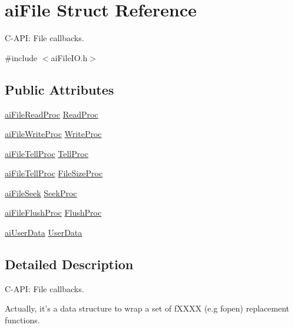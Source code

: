 \hypertarget{structai_file}{\section{ai\-File Struct Reference}
\label{structai_file}
}


C-\/\-A\-P\-I\-: File callbacks.  




{\ttfamily \#include $<$ai\-File\-I\-O.\-h$>$}

\subsection*{Public Attributes}
\begin{DoxyCompactItemize}
\item 
\hyperlink{ai_file_i_o_8h_ac75a77859a761dafe8c0a149316c9025}{ai\-File\-Read\-Proc} \hyperlink{structai_file_a52287e81ca67b9d43cc1ce6142f781fa}{Read\-Proc}
\item 
\hyperlink{ai_file_i_o_8h_ab25827ce1f6f1fcb37232f1e945947da}{ai\-File\-Write\-Proc} \hyperlink{structai_file_ab9fca3a62e34a33592c13a6f31db7d1d}{Write\-Proc}
\item 
\hyperlink{ai_file_i_o_8h_a91bcb34135f0fc52b84d0a71b1ac9416}{ai\-File\-Tell\-Proc} \hyperlink{structai_file_aaf2d88a3b2fcbdacf51119658283d27e}{Tell\-Proc}
\item 
\hyperlink{ai_file_i_o_8h_a91bcb34135f0fc52b84d0a71b1ac9416}{ai\-File\-Tell\-Proc} \hyperlink{structai_file_aff2fff8c0458e7ec71f7de217c3a3033}{File\-Size\-Proc}
\item 
\hyperlink{ai_file_i_o_8h_a21b9c66913c05cd79fad0eece086efb3}{ai\-File\-Seek} \hyperlink{structai_file_a7a07b499be4ad433669246479a4d4ad2}{Seek\-Proc}
\item 
\hyperlink{ai_file_i_o_8h_ab7018edd452f13ade57309865cb3bcdb}{ai\-File\-Flush\-Proc} \hyperlink{structai_file_a1102d28d1c0be68ffed20476669bdb0d}{Flush\-Proc}
\item 
\hyperlink{ai_file_i_o_8h_a176132d0cd51c96302089ff3f8a8ee1c}{ai\-User\-Data} \hyperlink{structai_file_aec528fa18f4755fe4f28d604fde28aad}{User\-Data}
\end{DoxyCompactItemize}


\subsection{Detailed Description}
C-\/\-A\-P\-I\-: File callbacks. 

Actually, it's a data structure to wrap a set of f\-X\-X\-X\-X (e.\-g fopen) replacement functions.

